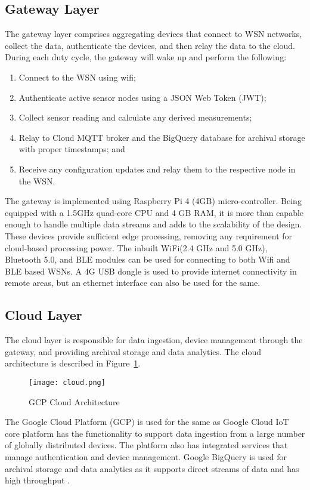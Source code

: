\subsection{Gateway Layer}

  The gateway layer comprises aggregating devices that connect to WSN networks, collect the data, authenticate the devices, and then relay the data to the cloud. During each duty cycle, the gateway will wake up and perform the following:
  \begin{enumerate}
    \item Connect to the WSN using wifi;
    \item Authenticate active sensor nodes using a JSON Web Token (JWT);
    \item Collect sensor reading and calculate any derived measurements;
    \item Relay to Cloud MQTT broker and the BigQuery database for archival storage with proper timestamps; and
    \item Receive any configuration updates and relay them to the respective node in the WSN.
  \end{enumerate}
  The gateway is implemented using Raspberry Pi 4 (4GB) micro-controller. Being equipped with a 1.5GHz quad-core CPU and 4 GB RAM, it is more than capable enough to handle multiple data streams and adds to the scalability of the design. These devices provide sufficient edge processing, removing any requirement for cloud-based processing power. The inbuilt WiFi(2.4 GHz and 5.0 GHz), Bluetooth 5.0, and BLE modules can be used for connecting to both Wifi and BLE based WSNs. A 4G USB dongle is used to provide internet connectivity in remote areas, but an ethernet interface can also be used for the same.

  \FloatBarrier
\subsection{Cloud Layer}
  The cloud layer is responsible for data ingestion, device management through the gateway, and providing archival storage and data analytics. The cloud architecture is described in Figure~\ref{fig:cloud}.


  \begin{figure}[!h]
    \centering
    \texttt{[image: cloud.png]}
    \caption{GCP Cloud Architecture}
    \label{fig:cloud}
  \end{figure}  

  The Google Cloud Platform (GCP) is used for the same as Google Cloud IoT core platform has the functionality to support data ingestion from a large number of globally distributed devices. The platform also has integrated services that manage authentication and device management. Google BigQuery is used for archival storage and data analytics as it supports direct streams of data and has high throughput \cite{iotCore,ref1.13}. 
  
